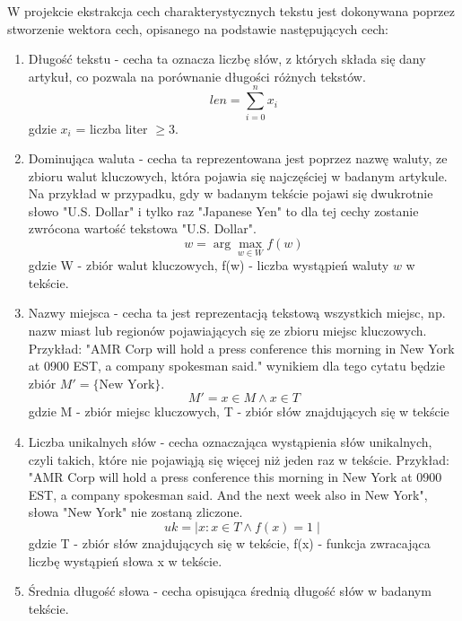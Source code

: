 \documentclass{article}
\begin{document}
W projekcie ekstrakcja cech charakterystycznych tekstu jest dokonywana poprzez stworzenie wektora cech, opisanego na podstawie następujących cech:
\begin{enumerate}
    \item Długość tekstu - cecha ta oznacza liczbę słów, z których składa się dany artykuł, co pozwala na porównanie długości różnych tekstów.
        \begin{equation}
            len = \sum_{i=0}^{n} x_i
        \end{equation}
        gdzie \( x_i \) = liczba liter \( \geq 3 \).
    \item Dominująca waluta - cecha ta reprezentowana jest poprzez nazwę waluty, ze zbioru walut kluczowych, która pojawia się najczęściej w badanym artykule. Na przykład w przypadku, gdy w badanym tekście pojawi się dwukrotnie słowo "U.S. Dollar" i tylko raz "Japanese Yen" to dla tej cechy zostanie zwrócona wartość tekstowa "U.S. Dollar".
        \begin{equation}
            w = \arg\max_{w \in W} f(w)
        \end{equation}
        gdzie W - zbiór walut kluczowych, f(w) - liczba wystąpień waluty \( w \) w tekście.
    \item Nazwy miejsca - cecha ta jest reprezentacją tekstową wszystkich miejsc, np. nazw miast lub regionów pojawiających się ze zbioru miejsc kluczowych. Przykład: "AMR Corp will hold a press conference this morning in New York at 0900 EST, a company spokesman said." wynikiem dla tego cytatu będzie zbiór \( M' = \{ \text{New York} \} \). 
        \begin{equation}
            M' =  x \in M  \land x \in T
        \end{equation}
        gdzie M - zbiór miejsc kluczowych, T - zbiór słów znajdujących się w tekście
    \item Liczba unikalnych słów - cecha oznaczająca wystąpienia słów unikalnych, czyli takich, które nie pojawiąją się więcej niż jeden raz w tekście. Przykład: "AMR Corp will hold a press conference this morning in New York at 0900 EST, a company spokesman said. And the next week also in New York", słowa "New York" nie zostaną zliczone.
        \begin{equation}
            uk = \mid x : x \in T \land f(x) = 1 \mid
        \end{equation}
        gdzie T - zbiór słów znajdujących się w tekście, f(x) - funkcja zwracająca liczbę wystąpień słowa x w tekście.
    \item Średnia długość słowa - cecha opisująca średnią długość słów w badanym tekście.

\end{enumerate}
\end{document}
